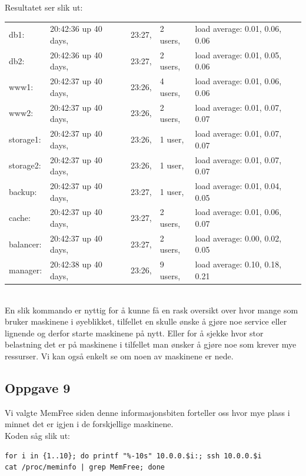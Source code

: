 \documentclass[a4paper, norsk, 12pt]{article}
\begin{document}
Resultatet ser slik ut:\\
\begin{tabular}{lllll}
db1: & 20:42:36 up 40 days, & 23:27, & 2 users, & load average: 0.01, 0.06, 0.06\\
db2: & 20:42:36 up 40 days, & 23:27, & 2 users, & load average: 0.01, 0.05, 0.06\\
www1: & 20:42:37 up 40 days, & 23:26, & 4 users,& load average: 0.01, 0.06, 0.06\\
www2: & 20:42:37 up 40 days, & 23:26, & 2 users,& load average: 0.01, 0.07, 0.07\\
storage1: & 20:42:37 up 40 days, & 23:26, & 1 user, & load average: 0.01, 0.07, 0.07\\
storage2: & 20:42:37 up 40 days, & 23:26, & 1 user, & load average: 0.01, 0.07, 0.07\\
backup: & 20:42:37 up 40 days, & 23:27, & 1 user, & load average: 0.01, 0.04, 0.05\\
cache: & 20:42:37 up 40 days, & 23:27, & 2 users, & load average: 0.01, 0.06, 0.07\\
balancer: & 20:42:37 up 40 days, & 23:27, & 2 users, & load average: 0.00, 0.02, 0.05\\
manager: & 20:42:38 up 40 days, & 23:26, & 9 users, & load average: 0.10, 0.18, 0.21
\end{tabular}
\\

En slik kommando er nyttig for å kunne få en rask oversikt over hvor mange som bruker maskinene i øyeblikket, tilfellet en skulle ønske å gjøre noe service eller lignende og derfor starte maskinene på nytt. Eller for å sjekke hvor stor belastning det er på maskinene i tilfellet man ønsker å gjøre noe som krever mye ressurser. Vi kan også enkelt se om noen av maskinene er nede.

\subsection{Oppgave 9}
Vi valgte MemFree siden denne informasjonsbiten forteller oss hvor mye plass i minnet det er igjen i de forskjellige maskinene. \\

Koden såg slik ut:\\
\begin{verbatim}
for i in {1..10}; do printf "%-10s" 10.0.0.$i:; ssh 10.0.0.$i 
cat /proc/meminfo | grep MemFree; done
\end{verbatim}
\end{document}
